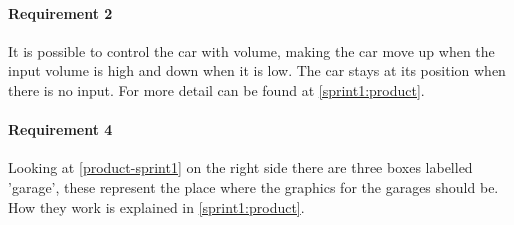 \paragraph{Requirement 2}\label{sprint1:req2}
It is possible to control the car with volume, making the car move up when the input volume is high and down when it is low.
The car stays at its position when there is no input.
For more detail can be found at \cref{sprint1:product}.
\paragraph{Requirement 4}\label{sprint1:req4}
Looking at \cref{product-sprint1} on the right side there are three boxes labelled 'garage', these represent the place where the graphics for the garages should be.
How they work is explained in \cref{sprint1:product}.